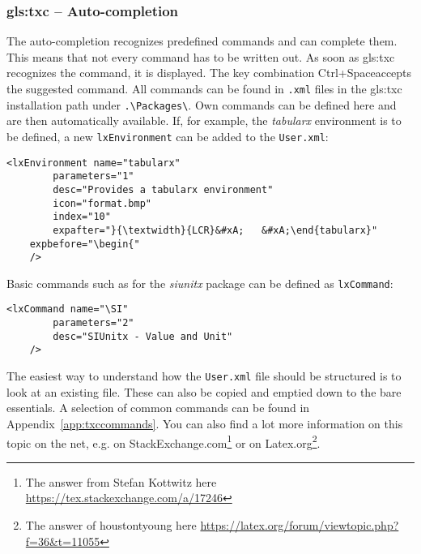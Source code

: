 \vfill
\subsubsection{\gls*{gls:txc} -- Auto-completion}
\label{sec:txc:autocomplete}
The auto-completion recognizes predefined commands and can complete them. This means that not every command has to be written out. As soon as \gls{gls:txc} recognizes the command, it is displayed. The key combination Ctrl+Spaceaccepts the suggested command. All commands can be found in \texttt{.xml} files in the \gls{gls:txc} installation path under \verb|.\Packages\|. Own commands can be defined here and are then automatically available. If, for example, the \textit{tabularx} environment is to be defined, a new \texttt{lxEnvironment} can be added to the \texttt{User.xml}:
\vfill
\begin{lstlisting}[language=none, caption={Defining a new shortcut for environments in \gls{gls:txc}}]
	<lxEnvironment name="tabularx" 
		parameters="1" 
		desc="Provides a tabularx environment"
		icon="format.bmp"
		index="10"
		expafter="}{\textwidth}{LCR}&#xA;	&#xA;\end{tabularx}" 
	expbefore="\begin{"
	/>
\end{lstlisting}

\vfill\newpage
Basic commands such as for the \textit{siunitx} package can be defined as \texttt{lxCommand}:

\begin{lstlisting}[language=none, caption={Defining a new shortcut for commands in \gls{gls:txc}}]
	<lxCommand name="\SI" 
		parameters="2"
		desc="SIUnitx - Value and Unit"
	/>
\end{lstlisting}

The easiest way to understand how the \texttt{User.xml} file should be structured is to look at an existing file. These can also be copied and emptied down to the bare essentials. A selection of common commands can be found in Appendix~\ref{app:txccommands}. You can also find a lot more information on this topic on the net, e.g. on StackExchange.com\footnote{The answer from Stefan Kottwitz here \url{https://tex.stackexchange.com/a/17246}} or on Latex.org\footnote{The answer of houstontyoung here \url{https://latex.org/forum/viewtopic.php?f=36&t=11055}}.




